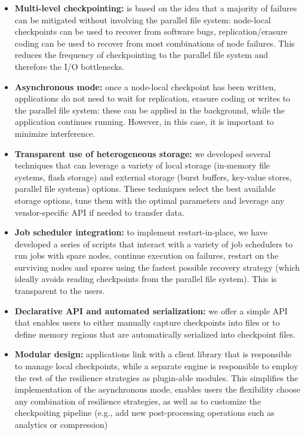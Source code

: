 \begin{itemize}
    \setlength{\itemindent}{-2em}
    \item \textbf{Multi-level checkpointing:} is based on the idea that
    a majority of failures can be mitigated without involving the parallel file system: node-local checkpoints can be used to recover from 
    software bugs, replication/erasure coding can be used to recover from 
    most combinations of node failures. This reduces the frequency of
    checkpointing to the parallel file system and therefore the I/O
    bottlenecks.
    \item \textbf{Asynchronous mode:} once a node-local checkpoint has been
    written, applications do not need to wait for replication, erasure
    coding or writes to the parallel file system: these can be applied
    in the background, while the application continues running. However,
    in this case, it is important to minimize interference.
    \item \textbf{Transparent use of heterogeneous storage:} we developed
    several techniques that can leverage a variety of 
    local storage (in-memory file systems, flash storage) and external
    storage (burst buffers, key-value stores, parallel file systems) options. These techniques select the best available storage options,
    tune them with the optimal parameters and leverage any vendor-specific
    API if needed to transfer data.
    \item \textbf{Job scheduler integration:} to implement restart-in-place,
    we have developed a series of scripts that interact with a variety
    of job schedulers to run jobs with spare nodes, continue execution on failures, restart on the surviving nodes and spares using the fastest possible recovery strategy (which ideally avoids reading checkpoints
    from the parallel file system). This is transparent to the users.
    \item \textbf{Declarative API and automated serialization:} 
    we offer a simple API that enables users to either manually
    capture checkpoints into files or to define memory regions
    that are automatically serialized into checkpoint files.
    \item \textbf{Modular design:} applications link with a client
    library that is responsible to manage local checkpoints, while
    a separate engine is responsible to employ the rest of the resilience
    strategies as plugin-able modules. This simplifies the implementation of the asynchronous mode, enables users the flexibility choose any
    combination of resilience strategies, as well as to customize 
    the checkpoiting pipeline (e.g., add new post-processing operations
    such as analytics or compression)
\end{itemize}
    
